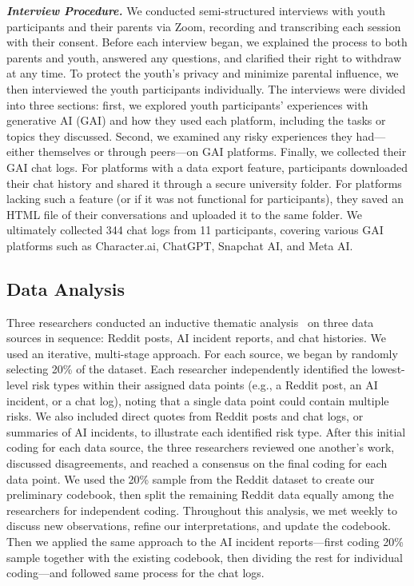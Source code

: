 \textit{\textbf{Interview Procedure.}}
We conducted semi-structured interviews with youth participants and their parents via Zoom, recording and transcribing each session with their consent. Before each interview began, we explained the process to both parents and youth, answered any questions, and clarified their right to withdraw at any time. To protect the youth's privacy and minimize parental influence, we then interviewed the youth participants individually. The interviews were divided into three sections: first, we explored youth participants' experiences with generative AI (GAI) and how they used each platform, including the tasks or topics they discussed. Second, we examined any risky experiences they had—either themselves or through peers—on GAI platforms. Finally, we collected their GAI chat logs. For platforms with a data export feature, participants downloaded their chat history and shared it through a secure university folder. For platforms lacking such a feature (or if it was not  functional for participants), they saved an HTML file of their conversations and uploaded it to the same folder. We ultimately collected 344 chat logs from 11 participants, covering various GAI platforms such as Character.ai, ChatGPT, Snapchat AI, and Meta AI.

\vspace{-8pt}
\subsection{Data Analysis}
\vspace{-3pt}
Three researchers conducted an inductive thematic analysis~\cite{braun2006using} on three data sources in sequence: Reddit posts, AI incident reports, and chat histories. We used an iterative, multi-stage approach. For each source, we began by randomly selecting 20\% of the dataset. Each researcher independently identified the lowest-level risk types within their assigned data points (e.g., a Reddit post, an AI incident, or a chat log), noting that a single data point could contain multiple risks. We also included direct quotes from Reddit posts and chat logs, or summaries of AI incidents, to illustrate each identified risk type. After this initial coding for each data source, the three researchers reviewed one another's work, discussed disagreements, and reached a consensus on the final coding for each data point. We used the 20\% sample from the Reddit dataset to create our preliminary codebook, then split the remaining Reddit data equally among the researchers for independent coding. Throughout this analysis, we met weekly to discuss new observations, refine our interpretations, and update the codebook. Then we applied the same approach to the AI incident reports—first coding 20\% sample together with the existing codebook, then dividing the rest for individual coding—and followed same process for the chat logs.

